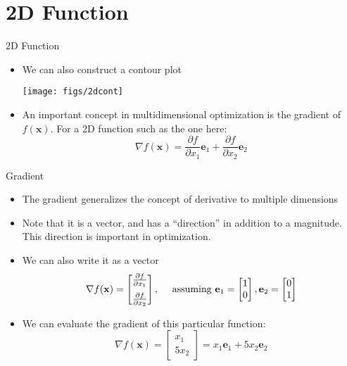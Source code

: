 \documentclass[xcolor=dvipsnames,11pt]{beamer}
\begin{document}
\section{2D Function}

\begin{frame}{2D Function}
	\begin{itemize}
		\item We can also construct a contour plot
		\begin{center}
			\texttt{[image: figs/2dcont]}
		\end{center}
		\item An important concept in multidimensional optimization is the gradient of $f(\mathbf{x})$. For a 2D function such as the one here:
		$$\nabla f(\mathbf{x}) = \frac{\partial f}{\partial x_1} \mathbf{e}_1 + \frac{\partial f}{\partial x_2} \mathbf{e}_2$$
	\end{itemize}
\end{frame}

\begin{frame}{Gradient}
	\begin{itemize}
		\item The gradient generalizes the concept of derivative to multiple dimensions
		\item Note that it is a vector, and has a ``direction'' in addition to a magnitude. This direction is important in optimization.
		\item We can also write it as a vector 
		$$\nabla f(\mathbf{x}) = \begin{bmatrix} \frac{\partial f}{\partial x_1} \vspace{0.2cm}\\  \frac{\partial f}{\partial x_2}\end{bmatrix},~~~\text{ assuming } \mathbf{e}_1 = \begin{bmatrix} 1 \\ 0  \end{bmatrix},  \mathbf{e}_2 = \begin{bmatrix} 0 \\ 1  \end{bmatrix}$$
		\vspace*{-\baselineskip}%
		\item We can evaluate the gradient of this particular function:
		$$\nabla f(\mathbf{x}) = \begin{bmatrix} x_1 \\ 5x_2 \end{bmatrix} = x_1 \mathbf{e}_1 + 5 x_2 \mathbf{e}_2$$
	\end{itemize}
\end{frame}
\end{document}
